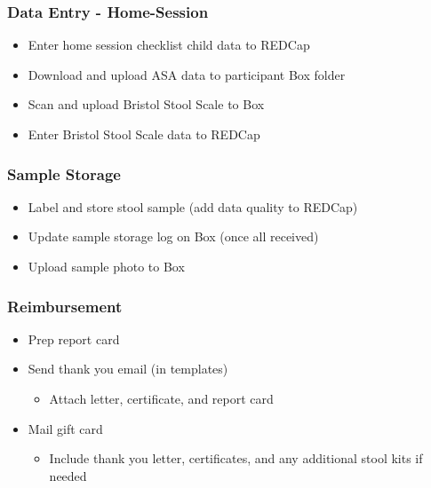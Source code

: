 \documentclass[
]{book}
\providecommand{\tightlist}{%
  \setlength{\itemsep}{0pt}\setlength{\parskip}{0pt}}
\begin{document}
\hypertarget{data-entry---home-session}{%
\subsubsection{Data Entry - Home-Session}\label{data-entry---home-session}}

\begin{itemize}
\tightlist
\item
  Enter home session checklist child data to REDCap
\item
  Download and upload ASA data to participant Box folder
\item
  Scan and upload Bristol Stool Scale to Box
\item
  Enter Bristol Stool Scale data to REDCap
\end{itemize}

\hypertarget{sample-storage-1}{%
\subsubsection{Sample Storage}\label{sample-storage-1}}

\begin{itemize}
\tightlist
\item
  Label and store stool sample (add data quality to REDCap)
\item
  Update sample storage log on Box (once all received)
\item
  Upload sample photo to Box
\end{itemize}

\hypertarget{reimbursement}{%
\subsubsection{Reimbursement}\label{reimbursement}}

\begin{itemize}
\tightlist
\item
  Prep report card
\item
  Send thank you email (in templates)

  \begin{itemize}
  \tightlist
  \item
    Attach letter, certificate, and report card
  \end{itemize}
\item
  Mail gift card

  \begin{itemize}
  \tightlist
  \item
    Include thank you letter, certificates, and any additional stool kits if needed
  \end{itemize}
\end{itemize}
\end{document}
